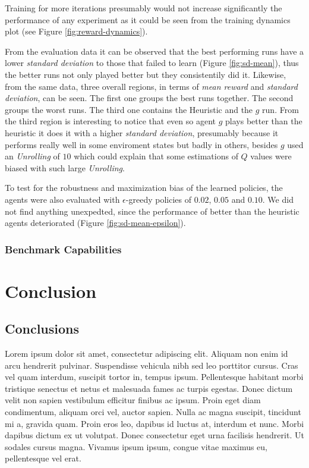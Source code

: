 \documentclass[
  openany]{book}
\begin{document}
Training for more iterations presumably would not increase significantly the performance of any experiment as it could be seen from the training dynamics plot (see Figure \ref{fig:reward-dynamics}).

From the evaluation data it can be observed that the best performing runs have a lower \emph{standard deviation} to those that failed to learn (Figure \ref{fig:sd-mean}), thus the better runs not only played better but they consistentily did it. Likewise, from the same data, three overall regions, in terms of \emph{mean reward} and \emph{standard deviation}, can be seen. The first one groups the best runs together. The second groups the worst runs. The third one contains the Heuristic and the \(g\) run. From the third region is interesting to notice that even so agent \(g\) plays better than the heuristic it does it with a higher \emph{standard deviation}, presumably because it performs really well in some enviroment states but badly in others, besides \(g\) used an \emph{Unrolling} of \(10\) which could explain that some estimations of \(Q\) values were biased with such large \emph{Unrolling}.

To test for the robustness and maximization bias of the learned policies, the agents were also evaluated with \(\epsilon\)-greedy policies of \(0.02\), \(0.05\) and \(0.10\). We did not find anything unexpedted, since the performance of better than the heuristic agents deteriorated (Figure \ref{fig:sd-mean-epsilon}).

\hypertarget{benchmark-capabilities}{%
\subsection{Benchmark Capabilities}\label{benchmark-capabilities}}

\hypertarget{conclusion}{%
\chapter{Conclusion}\label{conclusion}}

\hypertarget{conclusions}{%
\section{Conclusions}\label{conclusions}}

Lorem ipsum dolor sit amet, consectetur adipiscing elit. Aliquam non enim id arcu hendrerit pulvinar. Suspendisse vehicula nibh sed leo porttitor cursus. Cras vel quam interdum, suscipit tortor in, tempus ipsum. Pellentesque habitant morbi tristique senectus et netus et malesuada fames ac turpis egestas. Donec dictum velit non sapien vestibulum efficitur finibus ac ipsum. Proin eget diam condimentum, aliquam orci vel, auctor sapien. Nulla ac magna suscipit, tincidunt mi a, gravida quam. Proin eros leo, dapibus id luctus at, interdum et nunc. Morbi dapibus dictum ex ut volutpat. Donec consectetur eget urna facilisis hendrerit. Ut sodales cursus magna. Vivamus ipsum ipsum, congue vitae maximus eu, pellentesque vel erat.
\end{document}
